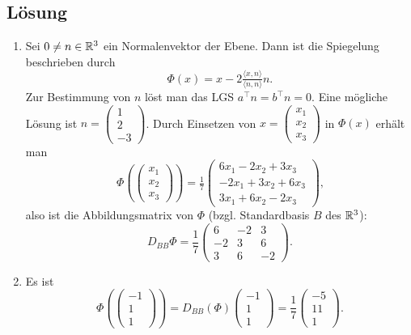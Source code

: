 \subsection{Lösung}
\begin{enumerate}
	\item Sei \( 0 \neq n \in \mathbb{R}^3 \) ein Normalenvektor der Ebene. Dann ist die Spiegelung beschrieben durch
	\begin{equation*}
	 	\Phi(x) = x- 2\tfrac{\langle x,n \rangle}{\langle n,n \rangle}n\text{.}
	 \end{equation*}
	 Zur Bestimmung von \( n \) löst man das LGS \( a^\top n = b^\top n = 0 \). Eine mögliche Lösung ist \( n = \left( \begin{smallmatrix}
	 	1 \\ 2 \\ -3
	 \end{smallmatrix} \right) \). Durch Einsetzen von \( x = \left( \begin{smallmatrix}
	 	x_1 \\ x_2 \\ x_3
	 \end{smallmatrix} \right) \) in \( \Phi(x) \) erhält man
	 \begin{equation*}
	 	\Phi\left( \left( \begin{smallmatrix}
	 		x_1 \\ x_2 \\ x_3
	 	\end{smallmatrix} \right) \right) = \tfrac{1}{7}\left( \begin{smallmatrix}
	 		6x_1-2x_2+3x_3 \\
	 		-2x_1+3x_2+6x_3 \\
	 		3x_1+6x_2-2x_3
	 	\end{smallmatrix} \right)\text{,}
	 \end{equation*}
	 also ist die Abbildungsmatrix von \( \Phi \) (bzgl. Standardbasis \( B \) des \( \mathbb{R}^3 \)):
	 \begin{equation*}
	 	D_{BB}{\Phi} = \frac{1}{7} \begin{pmatrix}
	 		6 & -2 & 3 \\
	 		-2 & 3 & 6 \\
	 		3 & 6 & -2
	 	\end{pmatrix}\text{.}
	 \end{equation*}
	 \item Es ist
	 \begin{equation*}
	 	\Phi\left( \begin{pmatrix}
	 		-1 \\ 1 \\ 1
	 	\end{pmatrix} \right) = D_{BB}(\Phi)\begin{pmatrix}
	 		-1 \\ 1 \\ 1
	 	\end{pmatrix} = \frac{1}{7}\begin{pmatrix}
	 		-5 \\ 11 \\ 1
	 	\end{pmatrix}\text{.}
	 \end{equation*}
\end{enumerate}

